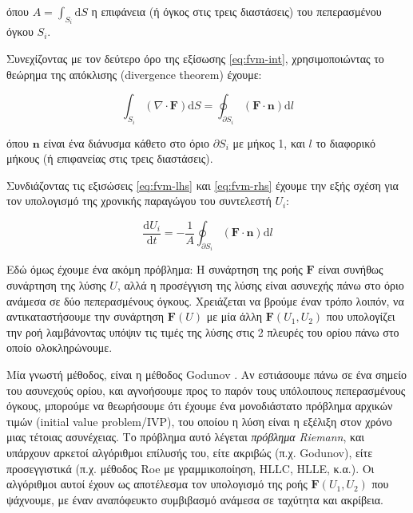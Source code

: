 όπου $A = \int_{S_i} \mathrm{d} S$ η επιφάνεια (ή όγκος στις τρεις διαστάσεις) του πεπερασμένου όγκου $S_i$.

Συνεχίζοντας με τον δεύτερο όρο της εξίσωσης \eqref{eq:fvm-int}, χρησιμοποιώντας το θεώρημα της απόκλισης (divergence theorem) έχουμε:

\begin{equation}
    \label{eq:fvm-rhs}
    \int_{S_i} \left( \nabla \cdot \mathbf{F} \right) \mathrm{d} S 
    = \oint_{\partial S_i} \left( \mathbf{F} \cdot \mathbf{n} \right) \mathrm{d} l
\end{equation}

όπου $\mathbf{n}$ είναι ένα διάνυσμα κάθετο στο όριο $\partial S_i$ με μήκος 1, και $l$ το διαφορικό μήκους (ή επιφανείας στις τρεις διαστάσεις).

Συνδιάζοντας τις εξισώσεις \eqref{eq:fvm-lhs} και \eqref{eq:fvm-rhs} έχουμε την εξής σχέση για τον υπολογισμό της χρονικής παραγώγου του συντελεστή $U_i$:

\begin{equation}
    \label{eq:fvm-update-cont}
    \frac{\mathrm{d} U_i}{\mathrm{d} t} = -\frac{1}{A} \oint_{\partial S_i} \left( \mathbf{F} \cdot \mathbf{n} \right) \mathrm{d} l
\end{equation}

Εδώ όμως έχουμε ένα ακόμη πρόβλημα: Η συνάρτηση της ροής $\mathbf{F}$ είναι συνήθως συνάρτηση της λύσης $U$, αλλά η προσέγγιση της λύσης είναι ασυνεχής πάνω στο όριο ανάμεσα σε δύο πεπερασμένους όγκους.
Χρειάζεται να βρούμε έναν τρόπο λοιπόν, να αντικαταστήσουμε την συνάρτηση $\mathbf{F}(U)$ με μία άλλη $\mathbf{F}\left(U_1, U_2\right)$ που υπολογίζει την ροή λαμβάνοντας υπόψιν τις τιμές της λύσης στις 2 πλευρές του ορίου πάνω στο οποίο ολοκληρώνουμε.

Μία γνωστή μέθοδος, είναι η μέθοδος Godunov \cite[p. ~105]{Knight2006}. Αν εστιάσουμε πάνω σε ένα σημείο του ασυνεχούς ορίου, και αγνοήσουμε προς το παρόν τους υπόλοιπους πεπερασμένους όγκους, μπορούμε να θεωρήσουμε ότι έχουμε ένα μονοδιάστατο πρόβλημα αρχικών τιμών (initial value problem/IVP), του οποίου η λύση είναι η εξέλιξη στον χρόνο μιας τέτοιας ασυνέχειας.
Το πρόβλημα αυτό λέγεται \emph{πρόβλημα Riemann}, και υπάρχουν αρκετοί αλγόριθμοι επίλυσής του, είτε ακριβώς (π.χ. Godunov), είτε προσεγγιστικά (π.χ. μέθοδος Roe με γραμμικοποίηση, HLLC, HLLE, κ.α.).
Οι αλγόριθμοι αυτοί έχουν ως αποτέλεσμα τον υπολογισμό της ροής $\mathbf{F}\left(U_1, U_2\right)$ που ψάχνουμε, με έναν αναπόφευκτο συμβιβασμό ανάμεσα σε ταχύτητα και ακρίβεια.

